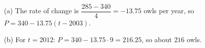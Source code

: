 (a) The rate of change is $\dfrac{285-340}{4}=-13.75$ owls per year, so $P=340-13.75(t-2003)$.

(b) For $t=2012$: $P=340-13.75\cdot9=216.25$, so about $\boxed{216}$ owls.
